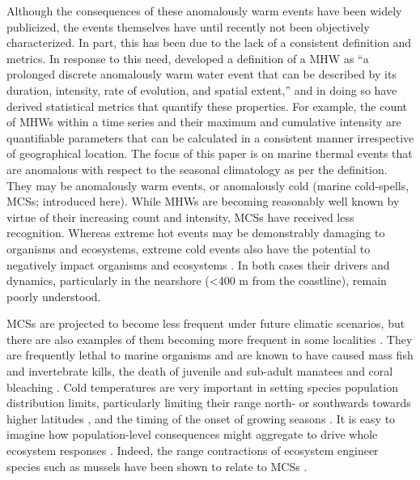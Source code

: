 \documentclass[a4paper,10pt,review]{elsarticle}
\begin{document}
Although the consequences of these anomalously warm events have been widely publicized, the events themselves have until recently not been objectively characterized. In part, this has been due to the lack of a consistent definition and metrics. In response to this need, \citet{Hobday2016} developed a definition of a MHW as ``a prolonged discrete anomalously warm water event that can be described by its duration, intensity, rate of evolution, and spatial extent,'' and in doing so have derived statistical metrics that quantify these properties. For example, the count of MHWs within a time series and their maximum and cumulative intensity are quantifiable parameters that can be calculated in a consistent manner irrespective of geographical location. The focus of this paper is on marine thermal events that are anomalous with respect to the seasonal climatology as per the \citet{Hobday2016} definition. They may be anomalously warm events, or anomalously cold (marine cold-spells, MCSs; introduced here). While MHWs are becoming reasonably well known by virtue of their increasing count and intensity, MCSs have received less recognition. Whereas extreme hot events may be demonstrably damaging to organisms and ecosystems, extreme cold events also have the potential to negatively impact organisms and ecosystems \citep{Lirman2011}. In both cases their drivers and dynamics, particularly in the nearshore (<400 m from the coastline), remain poorly understood.

MCSs are projected to become less frequent under future climatic scenarios, but there are also examples of them becoming more frequent in some localities \citep[e.g.][]{Gershunov2008, Matthes2015}. They are frequently lethal to marine organisms \citep{Woodward1987} and are known to have caused mass fish \citep{Gunter1941, Gunter1951, Holt1983} and invertebrate \citep{Gunter1951, Crisp1964} kills, the death of juvenile and sub-adult manatees \citep{OShea1985, Marsh1986} and coral bleaching \citep{Lirman2011}. Cold temperatures are very important in setting species population distribution limits, particularly limiting their range north- or southwards towards higher latitudes \citep{Firth2011}, and the timing of the onset of growing seasons \citep{Jentsch2007}. It is easy to imagine how population-level consequences might aggregate to drive whole ecosystem responses \citep[e.g.][]{Kreyling2008, Rehage2016}. Indeed, the range contractions of ecosystem engineer species such as mussels have been shown to relate to MCSs \citep{Firth2011, Firth2015}.
\end{document}

